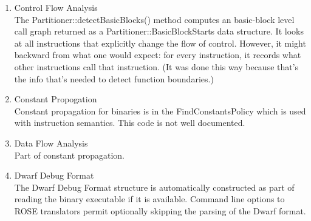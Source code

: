 \begin{enumerate}
\begin{enumerate}
      \item Control Flow Analysis \\
      The Partitioner::detectBasicBlocks() method computes an
      basic-block level call graph returned as a
      Partitioner::BasicBlockStarts data structure. It looks at all
      instructions that explicitly change the flow of
      control. However, it might backward from what one would
      expect: for every instruction, it records what other
      instructions call that instruction. (It was done this way
      because that's the info that's needed to detect function
      boundaries.)

      \item Constant Propogation \\
      Constant propagation for binaries is in the
      FindConstantsPolicy which is used with instruction
      semantics. This code is not well documented.

      \item Data Flow Analysis \\
      Part of constant propagation.

      \item Dwarf Debug Format \\
      The Dwarf Debug Format structure is automatically constructed 
      as part of reading the binary executable if it is available.
      Command line options to ROSE translators permit optionally 
      skipping the parsing of the Dwarf format.
   \end{enumerate}
\end{enumerate}

